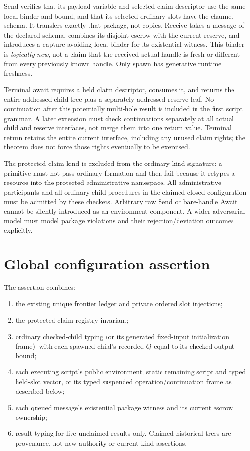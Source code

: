 \documentclass[11pt]{article}
\begin{document}
Send verifies that its payload variable and selected claim descriptor use the same local binder and bound, and that its selected ordinary slots have the channel schema. It transfers exactly that package, not copies. Receive takes a message of the declared schema, combines its disjoint escrow with the current reserve, and introduces a capture-avoiding local binder for its existential witness. This binder is \emph{logically new}, not a claim that the received actual handle is fresh or different from every previously known handle. Only spawn has generative runtime freshness.

Terminal await requires a held claim descriptor, consumes it, and returns the entire addressed child tree plus a separately addressed reserve leaf. No continuation after this potentially multi-hole result is included in the first script grammar. A later extension must check continuations separately at all actual child and reserve interfaces, not merge them into one return value. Terminal return retains the entire current interface, including any unused claim rights; the theorem does not force those rights eventually to be exercised.

The protected claim kind is excluded from the ordinary kind signature: a primitive must not pass ordinary formation and then fail because it retypes a resource into the protected administrative namespace. All administrative participants and all ordinary child procedures in the claimed closed configuration must be admitted by these checkers. Arbitrary raw Send or bare-handle Await cannot be silently introduced as an environment component. A wider adversarial model must model package violations and their rejection/deviation outcomes explicitly.

\section{Global configuration assertion}
The assertion combines:
\begin{enumerate}
\item the existing unique frontier ledger and private ordered slot injections;
\item the protected claim registry invariant;
\item ordinary checked-child typing (or its generated fixed-input initialization frame), with each spawned child's recorded $Q$ equal to its checked output bound;
\item each executing script's public environment, static remaining script and typed held-slot vector, or its typed suspended operation/continuation frame as described below;
\item each queued message's existential package witness and its current escrow ownership;
\item result typing for live unclaimed results only. Claimed historical trees are provenance, not new authority or current-kind assertions.
\end{enumerate}
\end{document}
